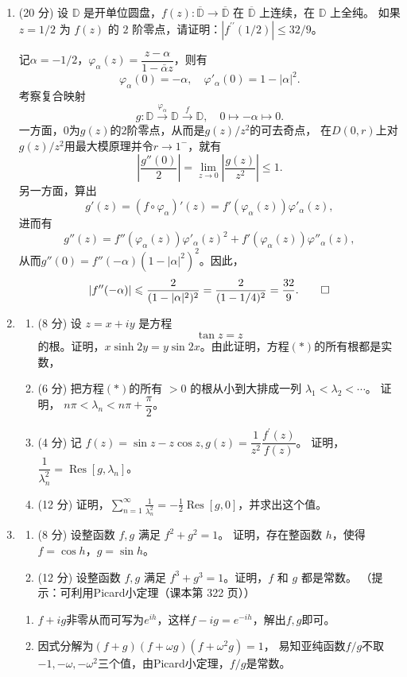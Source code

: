 \begin{enumerate}
\item[四] (20 分) 设 $\mathbb{D}$ 是开单位圆盘，$f(z): \overline{\mathbb{D}} \rightarrow \overline{\mathbb{D}}$ 在 $\overline{\mathbb{D}}$ 上连续，在 $\mathbb{D}$ 上全纯。
如果 $z=1/2$ 为 $f(z)$ 的 $2$ 阶零点，请证明：$|f^{\prime \prime}(1/2)| \leqslant 32/9$。
\begin{proofc}
记$\alpha=-1/2$，$\varphi_\alpha(z)=\dfrac{z-\alpha}{1-\bar{\alpha}z}$，则有
\[\varphi_\alpha(0)=-\alpha,\quad\varphi'_\alpha(0)=1-|\alpha|^2.\]
考察复合映射\[g:\mathbb{D}\stackrel{\varphi_\alpha}{\longrightarrow}
\mathbb{D}\stackrel{f}{\longrightarrow}\mathbb{D},\quad0\mapsto-\alpha\mapsto0.\]
一方面，$0$为$g(z)$的$2$阶零点，从而是$g(z)/z^2$的可去奇点，
在$D(0,r)$上对$g(z)/z^2$用最大模原理并令$r\to1^-$，就有
\[\left|\frac{g''(0)}{2}\right|=\lim_{z\to0}\left|\frac{g(z)}{z^2}\right|\leqslant1.\]
另一方面，算出\[g'(z)=(f\circ\varphi_\alpha)'(z)=f'(\varphi_\alpha(z))\varphi'_\alpha(z),\]
进而有\[g''(z)=f''(\varphi_\alpha(z))\varphi'_\alpha(z)^2+f'(\varphi_\alpha(z))\varphi''_\alpha(z),\]
从而$g''(0)=f''(-\alpha)(1-|\alpha|^2)^2$。因此，
\[|f''(-\alpha)|\leqslant\frac{2}{(1-|\alpha|^2)^2}=\frac{2}{(1-1/4)^2}=\frac{32}{9}.\qedhere\]
\end{proofc}

\item[五]
\begin{enumerate}[label=(\arabic*)]
\item (8 分) 设 $z=x+iy$ 是方程
\[\tan z=z \tag{$*$}\]
的根。证明，$x \sinh 2y=y \sin 2x$。由此证明，方程$(*)$的所有根都是实数，
\item (6 分) 把方程$(*)$的所有 $>0$ 的根从小到大排成一列 $\lambda_{1}<\lambda_{2}<\cdots$。
证明， $n \pi<\lambda_{n}<n \pi+\dfrac{\pi}{2}$。
\item (4 分) 记 $f(z)=\sin z-z \cos z, g(z)=\dfrac{1}{z^{2}} \dfrac{f^{\prime}(z)}{f(z)}$。
证明，$\dfrac{1}{\lambda_{n}^{2}}=\operatorname{Res}[g, \lambda_{n}]$。
\item (12 分) 证明，$\displaystyle\sum_{n=1}^{\infty} \frac{1}{\lambda_{n}^{2}}=-\frac{1}{2} \operatorname{Res}[g, 0]$，并求出这个值。
\end{enumerate}

\item[六]
\begin{enumerate}[label=(\arabic*)]
\item (8 分) 设整函数 $f, g$ 满足 $f^{2}+g^{2}=1$。
证明，存在整函数 $h$，使得 $f=\cos h$，$g=\sin h$。
\item (12 分) 设整函数 $f, g$ 满足 $f^{3}+g^{3}=1$。证明，$f$ 和 $g$ 都是常数。
（提示：可利用Picard小定理（课本第 322 页））
\end{enumerate}
\begin{proofc}
\begin{enumerate}[label=(\arabic*)]
\item $f+ig$非零从而可写为$e^{ih}$，这样$f-ig=e^{-ih}$，解出$f,g$即可。
\item 因式分解为$(f+g)(f+\omega g)(f+\omega^2 g)=1$，
易知亚纯函数$f/g$不取$-1,-\omega,-\omega^2$三个值，由Picard小定理，$f/g$是常数。\qedhere
\end{enumerate}
\end{proofc}
\end{enumerate}

